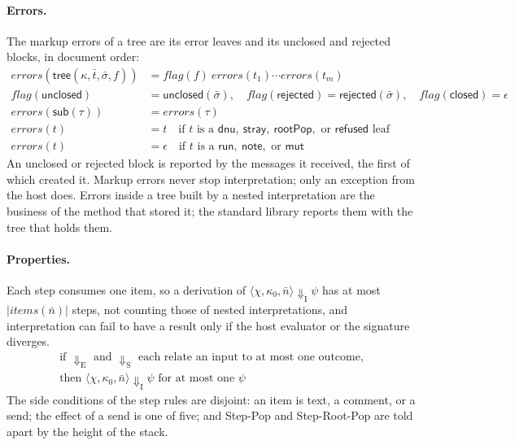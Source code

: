 \documentclass[11pt]{article}
\numberwithin{equation}{section}
\newcommand{\kw}[1]{\ensuremath{\mathsf{#1}}}
\begin{document}
\paragraph{Errors.}
The markup errors of a tree are its error leaves and its unclosed and
rejected blocks, in document order:
\begin{equation}\label{eq:errors}
\begin{aligned}
\mathit{errors}(\kw{tree}(\kappa, \bar t, \bar\sigma, f)) &=
  \mathit{flag}(f)\ \mathit{errors}(t_1) \cdots \mathit{errors}(t_m) \\
\mathit{flag}(\kw{unclosed}) &= \kw{unclosed}(\bar\sigma),\quad
\mathit{flag}(\kw{rejected}) = \kw{rejected}(\bar\sigma),\quad
\mathit{flag}(\kw{closed}) = \epsilon \\
\mathit{errors}(\kw{sub}(\tau)) &= \mathit{errors}(\tau) \\
\mathit{errors}(t) &= t
  \quad\text{if } t \text{ is a } \kw{dnu},\ \kw{stray},\ \kw{rootPop},
    \text{ or } \kw{refused} \text{ leaf} \\
\mathit{errors}(t) &= \epsilon
  \quad\text{if } t \text{ is a } \kw{run},\ \kw{note},
    \text{ or } \kw{mut}
\end{aligned}
\end{equation}
An unclosed or rejected block is reported by the messages it received, the
first of which created it.  Markup errors never stop interpretation; only an
exception from the host does.  Errors inside a tree built by a nested
interpretation are the business of the method that stored it; the
standard library reports them with the tree that holds them.

\paragraph{Properties.}
Each step consumes one item, so a derivation of
$\langle \chi, \kappa_0, \bar n \rangle \Downarrow_{\mathrm{I}} \psi$ has
at most $|\mathit{items}(\bar n)|$ steps, not counting those of nested
interpretations, and interpretation can fail to
have a result only if the host evaluator or the signature diverges.
\begin{multline}\label{eq:interp-determinism}
\text{if } \Downarrow_{\mathrm{E}} \text{ and } \Downarrow_{\mathrm{S}}
\text{ each relate an input to at most one outcome,} \\
\text{then }
\langle \chi, \kappa_0, \bar n \rangle \Downarrow_{\mathrm{I}} \psi
\text{ for at most one } \psi
\end{multline}
The side conditions of the step rules are disjoint: an item is text, a
comment, or a send; the effect of a send is one of five; and Step-Pop and
Step-Root-Pop are told apart by the height of the stack.
\end{document}
